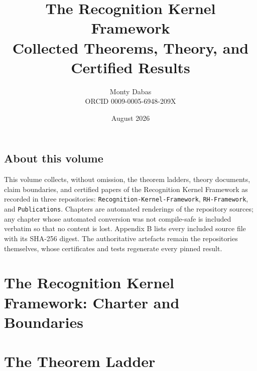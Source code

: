 \documentclass[11pt,openany]{book}
\title{\Huge The Recognition Kernel Framework\\[0.4em]
\Large Collected Theorems, Theory, and Certified Results}
\author{Monty Dabas\\\small ORCID 0009-0005-6948-209X}
\date{August 2026}
\begin{document}
\frontmatter\maketitle
\chapter*{About this volume}
This volume collects, without omission, the theorem ladders, theory
documents, claim boundaries, and certified papers of the Recognition
Kernel Framework as recorded in three repositories:
\texttt{Recognition-Kernel-Framework}, \texttt{RH-Framework}, and
\texttt{Publications}. Chapters are automated renderings of the
repository sources; any chapter whose automated conversion was not
compile-safe is included verbatim so that no content is lost. Appendix
B lists every included source file with its SHA-256 digest. The
authoritative artefacts remain the repositories themselves, whose
certificates and tests regenerate every pinned result.
\tableofcontents\mainmatter\pagestyle{plain}
\part{The Recognition Kernel Framework: Charter and Boundaries}








\part{The Theorem Ladder}












































\end{document}
